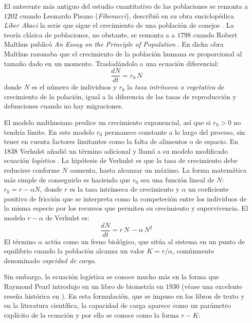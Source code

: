 El antecente más antiguo del estudio cuantitativo de las poblaciones se remonta a $1202$ cuando Leonardo Pisano (\textit{Fibonacci}), describió en su obra enciclopédica {\em Liber Abaci} la serie que sigue el crecimiento de una población de conejos \cite{sigler2002}. La teoría clásica de poblaciones, no obstante, se remonta a a $1798$ cuando Robert Malthus publicó {\em An Essay on the Principle of Population} \citep{malthus1798}. En dicha obra Malthus razonaba que el crecimiento de la población humana es proporcional al tamaño dado en un momento. Trasladándolo a una ecuación diferencial:
\begin{equation}
\frac{dN}{dt}=r_0\, N 
\label{eq:malthus}
\end{equation}
\noindent donde $N$ es el número de individuos y $r_0$ la {\em tasa intrínseca o vegetativa} de crecimiento de la polación, igual a la diferencia de las tasas de reproducción y defunciones cuando no hay migraciones.

El modelo malthusiano predice un crecimiento exponencial, así que si $r_0 > 0$ no tendría límite. En este modelo $r_0$ permanece constante a lo largo del proceso, sin tener en cuenta factores limitantes como la falta de alimentos o de espacio. En $1838$ Verhulst añadió un término adicional y llamó a su modelo modificado ecuación \emph{logística} \cite{verhulst1845}. La hipótesis de Verhulst es que la tasa de crecimiento debe reducirse conforme $N$ aumenta, hasta alcanzar un máximo. La forma matemática más simple de conseguirlo es haciendo que $r_0$ sea una función lineal de $N$: $ r_0 = r - \alpha N$, donde $r$ es la tasa intrínseca de crecimiento y $\alpha$ un coeficiente positivo de fricción que se interpreta como la competeción entre los individuos de la misma especie por los recursos que permiten su crecimiento y supervivencia. El modelo $r-\alpha$ de Verhulst es:
\begin{equation}
\frac{dN}{dt}=r \, N \,  - \alpha  \, N^2 
\label{eq:primitiveverhulst}
\end{equation}
El término $\alpha$ actúa como un freno biológico, que sitúa al sistema en un punto de equilibrio cuando la población alcanza un valor $ K = r / \alpha$, comúnmente denominado \emph{capcidad de carga}.

Sin embargo, la ecuación logística se conoce mucho más en la forma que Raymond Pearl introdujo en un libro de biometría en $1930$ (véase una excelente reseña histórica en \cite{mallet2012struggle}). En esta formulación, que se impuso en los libros de texto y en la literatura científica, la capacidad de carga aparece como un parámetro explícito de la ecuación y por ello se conoce como la forma $r-K$:


